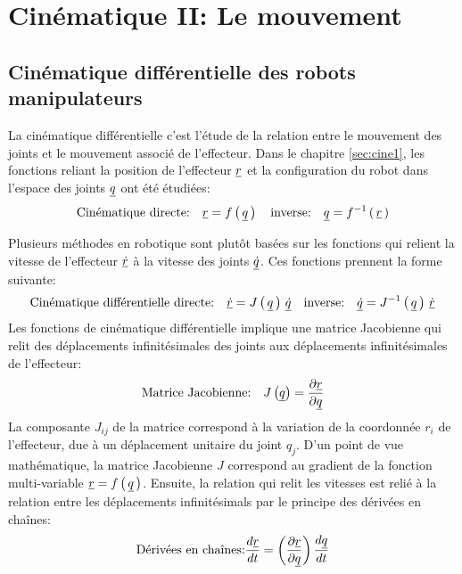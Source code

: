 \chapter{Cinématique II: Le mouvement}
\label{sec:cinediff}



\section{Cinématique différentielle des robots manipulateurs}


La cinématique différentielle c'est l'étude de la relation entre le mouvement des joints et le mouvement associé de l'effecteur. Dans le chapitre \ref{sec:cine1}, les fonctions reliant la position de l'effecteur $\underline{r}$ et la configuration du robot dans l'espace des joints $\underline{q}$ ont été étudiées:
\begin{equation}
\text{Cinématique directe:}  \quad \underline{r} = f\left( \, \underline{q} \, \right)  \quad  \text{inverse:} \quad \underline{q} = f^{-1}\left( \, \underline{r}  \, \right) 
\end{equation}

Plusieurs méthodes en robotique sont plutôt basées sur les fonctions qui relient la vitesse de l'effecteur $\underline{\dot{r}}$ à la vitesse des joints $\underline{\dot{q}}$. Ces fonctions prennent la forme suivante:
\begin{equation}
\text{Cinématique différentielle directe:} \quad \underline{\dot{r}} = J\left( \, \underline{q} \, \right) \, \underline{\dot{q}}   \quad \text{inverse:} \quad \underline{\dot{q}} = J^{-1}\left( \, \underline{q} \, \right) \, \underline{\dot{r}}
\end{equation}
Les fonctions de cinématique différentielle implique une matrice Jacobienne qui relit des déplacements infinitésimales des joints aux déplacements infinitésimales de l'effecteur:
\begin{equation}
\text{Matrice Jacobienne:} \quad J\left( \underline{q} \right) = \frac{\partial \underline{r}}{\partial \underline{q}}
\end{equation}
La composante $J_{ij}$ de la matrice correspond à la variation de la coordonnée $r_i$ de l'effecteur, due à un déplacement unitaire du joint $q_j$. D'un point de vue mathématique, la matrice Jacobienne $J$ correspond au gradient de la fonction multi-variable $\underline{r} = f\left( \, \underline{q} \, \right)$. Ensuite, la relation qui relit les vitesses est relié à la relation entre les déplacements infinitésimals par le principe des dérivées en chaînes:
\begin{equation}
\text{Dérivées en chaînes:} \frac{d \underline{r}}{dt} = \left( \frac{\partial \underline{r}}{\partial \underline{q}} \right) \frac{d \underline{q}}{dt} 
\end{equation}

